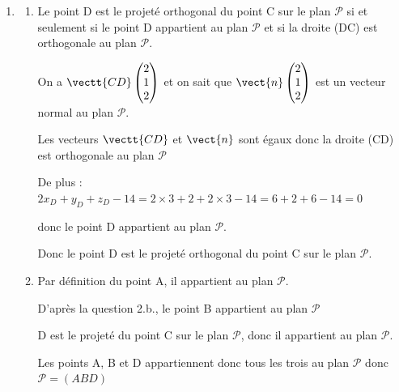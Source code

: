 \begin{enumerate}
\begin{enumerate}
			Une équation cartésienne de $\mathcal{P}$ est donc bien :   $2x + y + 2z - 14 = 0$.
			\item  Un point appartient à un plan si et seulement si ses coordonnées vérifient une équation de ce plan.

			$2x_B+y_B+z_B-14 = 2 \times 5 -2 +2 \times 3 -14 =10-2+6-14 =0 $ 

			donc le point B appartient au plan $\mathcal{P}$.
			
			$2x_C+y_C+z_C-14 = 2 \times 1 +1 +2 \times 1 -14 = 2+1+2-14=-9 \neq 0 $ 
			
			donc le point C n'appartient pas au plan $\mathcal{P}$. 
			
		\end{enumerate}
		\item %
		\begin{enumerate}
			\item    Le point D est le projeté orthogonal du point C sur le plan $\mathcal{P}$ si et seulement si le point D appartient au plan $\mathcal{P}$ et si la droite (DC) est orthogonale au plan $\mathcal{P}$.

On a $\vectt{CD} \begin{pmatrix} 2\\1\\2  \end{pmatrix}$ et on sait que $\vect{n}\begin{pmatrix} 2 \\1\\2 \end{pmatrix}$ est un vecteur normal au plan $\mathcal{P}$.

Les vecteurs $\vectt{CD}$ et $\vect{n}$ sont égaux donc la droite (CD) est orthogonale au plan $\mathcal{P}$

De plus : $2x_D+y_D+z_D-14 = 2 \times 3 +2 +2 \times 3 -14 =6 +2+6-14 =0 $

donc le point D appartient au plan $\mathcal{P}$.

Donc le point D est le projeté orthogonal du point C sur le plan $\mathcal{P}$.
	\item  Par définition du point A, il appartient au plan $\mathcal{P}$. 

D'après la question 2.b., le point B appartient au plan $\mathcal{P}$

D est le projeté du point C sur le plan $\mathcal{P}$, donc il appartient au plan $\mathcal{P}$.

Les points A, B  et D  appartiennent donc tous les trois au plan $\mathcal{P}$  donc $\mathcal{P} = (ABD)$
	

\end{enumerate}
\end{enumerate}
